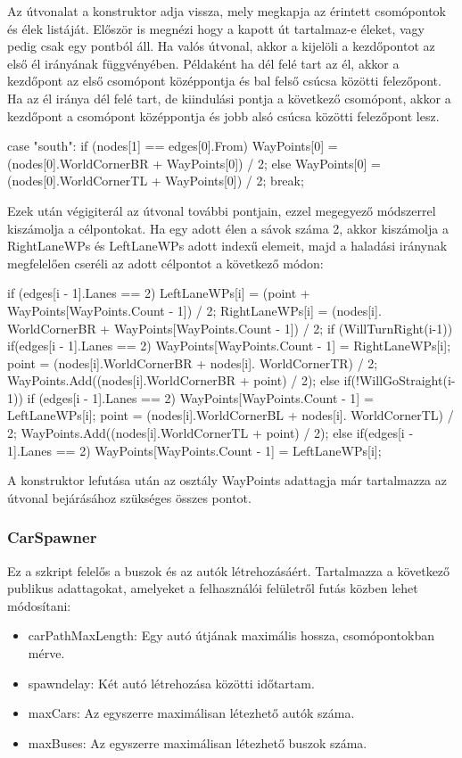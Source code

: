Az útvonalat a konstruktor adja vissza, mely megkapja az érintett csomópontok és élek listáját. Először is megnézi hogy a kapott út tartalmaz-e éleket, vagy pedig csak egy pontból áll. Ha valós útvonal, akkor a kijelöli a kezdőpontot az első él irányának függvényében. Példaként ha dél felé tart az él, akkor a kezdőpont az első csomópont középpontja és bal felső csúcsa közötti felezőpont. Ha az él iránya dél felé tart, de kiindulási pontja a következő csomópont, akkor a kezdőpont a csomópont középpontja és jobb alsó csúcsa közötti felezőpont lesz.
\begin{cpp}
case "south":
    if (nodes[1] == edges[0].From)
    {
        WayPoints[0] = (nodes[0].WorldCornerBR + 
        WayPoints[0]) / 2;
    }
    else
    {
        WayPoints[0] = (nodes[0].WorldCornerTL +
         WayPoints[0]) / 2;
    }
    break;
\end{cpp}
Ezek után végigiterál az útvonal további pontjain, ezzel megegyező módszerrel kiszámolja a célpontokat. Ha egy adott élen a sávok száma 2, akkor kiszámolja a RightLaneWPs és LeftLaneWPs adott indexű elemeit, majd a haladási iránynak megfelelően cseréli az adott célpontot a következő módon:
\begin{cpp}
if (edges[i - 1].Lanes == 2)
{
    LeftLaneWPs[i] = (point + 
    WayPoints[WayPoints.Count - 1]) / 2;
    RightLaneWPs[i] = (nodes[i].
    WorldCornerBR + WayPoints[WayPoints.Count - 1]) / 2;
}
if (WillTurnRight(i-1))
{
    if(edges[i - 1].Lanes == 2)
    {
        WayPoints[WayPoints.Count - 1] = RightLaneWPs[i];
    }
    point = (nodes[i].WorldCornerBR + nodes[i].
    WorldCornerTR) / 2;
    WayPoints.Add((nodes[i].WorldCornerBR + point) / 2);
}
else if(!WillGoStraight(i-1))
{
    if (edges[i - 1].Lanes == 2)
    {
    WayPoints[WayPoints.Count - 1] = LeftLaneWPs[i];
    }
    point = (nodes[i].WorldCornerBL + nodes[i].
    WorldCornerTL) / 2;
    WayPoints.Add((nodes[i].WorldCornerTL + point) / 2);
}
else if(edges[i - 1].Lanes == 2)
{
    WayPoints[WayPoints.Count - 1] = LeftLaneWPs[i];
}
\end{cpp}

A konstruktor lefutása után az osztály WayPoints adattagja már tartalmazza az útvonal bejárásához szükséges összes pontot.
\subsubsection{CarSpawner}
Ez a szkript felelős a buszok és az autók létrehozásáért. Tartalmazza a következő publikus adattagokat, amelyeket a felhasználói felületről futás közben lehet módosítani:
\begin{itemize}
\item{carPathMaxLength: Egy autó útjának maximális hossza, csomópontokban mérve.}
\item{spawndelay: Két autó létrehozása közötti időtartam.}
\item{maxCars: Az egyszerre maximálisan létezhető autók száma.}
\item{maxBuses: Az egyszerre maximálisan létezhető buszok száma.}
\end{itemize}

